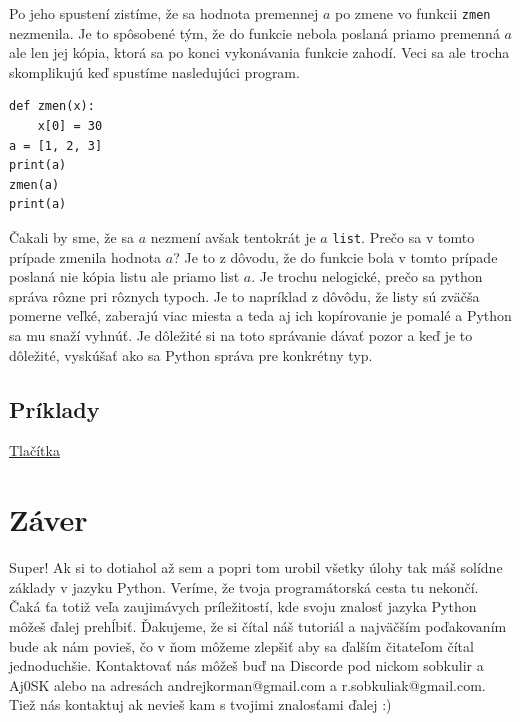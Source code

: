 \documentclass{article}
\begin{document}
Po jeho spustení zistíme, že sa hodnota premennej $a$ po zmene vo funkcii \texttt{zmen} nezmenila. Je to spôsobené tým, že do funkcie nebola poslaná priamo premenná $a$ ale len jej kópia, ktorá sa po konci vykonávania funkcie zahodí. Veci sa ale trocha skomplikujú keď spustíme nasledujúci program.

\begin{lstlisting}
def zmen(x):
    x[0] = 30
a = [1, 2, 3]
print(a)
zmen(a)
print(a)
\end{lstlisting}

Čakali by sme, že sa $a$ nezmení avšak tentokrát je $a$ \texttt{list}. Prečo sa v tomto prípade zmenila hodnota $a$? Je to z dôvodu, že do funkcie bola v tomto prípade poslaná nie kópia listu ale priamo list $a$. Je trochu nelogické, prečo sa python správa rôzne pri rôznych typoch. Je to napríklad z dôvôdu, že listy sú zväčša pomerne veľké, zaberajú viac miesta a teda aj ich kopírovanie je pomalé a Python sa mu snaží vyhnúť. Je dôležité si na toto správanie dávať pozor a keď je to dôležité, vyskúšať ako sa Python správa pre konkrétny typ.

\subsection{Príklady}
\href{https://testovac.ksp.sk/tasks/ls-uvod-tlacitka/}{Tlačítka}

\section{Záver}

Super! Ak si to dotiahol až sem a popri tom urobil všetky úlohy tak máš solídne základy v jazyku Python. Veríme, že tvoja programátorská cesta tu nekončí. Čaká ťa totiž veľa zaujimávych príležitostí, kde svoju znalosť jazyka Python môžeš ďalej prehĺbiť. Ďakujeme, že si čítal náš tutoriál a najväčším poďakovaním bude ak nám povieš, čo v ňom môžeme zlepšiť aby sa ďalším čitateľom čítal jednoduchšie. Kontaktovať nás môžeš buď na Discorde pod nickom sobkulir a Aj0SK alebo na adresách andrejkorman@gmail.com a r.sobkuliak@gmail.com. Tiež nás kontaktuj ak nevieš kam s tvojimi znalosťami ďalej :)


\end{document}

